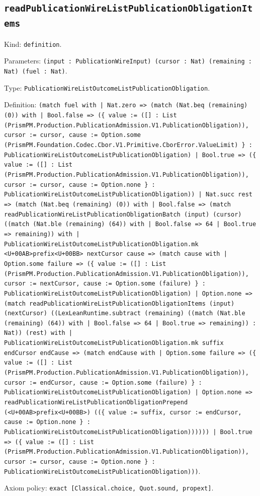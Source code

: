 \documentclass[11pt]{article}
\begin{document}
\subsection*{\texttt{readPublicationWireListPublicationObligationItems}}
\noindent Kind: \texttt{definition}.\par
\noindent Parameters: \texttt{(input : PublicationWireInput) (cursor : Nat) (remaining : Nat) (fuel : Nat)}.\par
\noindent Type: \texttt{PublicationWireListOutcomeListPublicationObligation}.\par
\noindent Definition: \texttt{(match fuel with | Nat.zero => (match (Nat.beq (remaining) (0)) with | Bool.false => (\{ value := ([] : List (PrismPM.Production.PublicationAdmission.V1.PublicationObligation)), cursor := cursor, cause := Option.some (PrismPM.Foundation.Codec.Cbor.V1.Primitive.CborError.ValueLimit) \} : PublicationWireListOutcomeListPublicationObligation) | Bool.true => (\{ value := ([] : List (PrismPM.Production.PublicationAdmission.V1.PublicationObligation)), cursor := cursor, cause := Option.none \} : PublicationWireListOutcomeListPublicationObligation)) | Nat.succ rest => (match (Nat.beq (remaining) (0)) with | Bool.false => (match readPublicationWireListPublicationObligationBatch (input) (cursor) ((match (Nat.ble (remaining) (64)) with | Bool.false => 64 | Bool.true => remaining)) with | PublicationWireListOutcomeListPublicationObligation.mk <U+00AB>prefix<U+00BB> nextCursor cause => (match cause with | Option.some failure => (\{ value := ([] : List (PrismPM.Production.PublicationAdmission.V1.PublicationObligation)), cursor := nextCursor, cause := Option.some (failure) \} : PublicationWireListOutcomeListPublicationObligation) | Option.none => (match readPublicationWireListPublicationObligationItems (input) (nextCursor) ((LexLeanRuntime.subtract (remaining) ((match (Nat.ble (remaining) (64)) with | Bool.false => 64 | Bool.true => remaining)) : Nat)) (rest) with | PublicationWireListOutcomeListPublicationObligation.mk suffix endCursor endCause => (match endCause with | Option.some failure => (\{ value := ([] : List (PrismPM.Production.PublicationAdmission.V1.PublicationObligation)), cursor := endCursor, cause := Option.some (failure) \} : PublicationWireListOutcomeListPublicationObligation) | Option.none => readPublicationWireListPublicationObligationPrepend (<U+00AB>prefix<U+00BB>) ((\{ value := suffix, cursor := endCursor, cause := Option.none \} : PublicationWireListOutcomeListPublicationObligation)))))) | Bool.true => (\{ value := ([] : List (PrismPM.Production.PublicationAdmission.V1.PublicationObligation)), cursor := cursor, cause := Option.none \} : PublicationWireListOutcomeListPublicationObligation)))}.\par
\noindent Axiom policy: \texttt{exact [Classical.choice, Quot.sound, propext]}.\par
\end{document}
